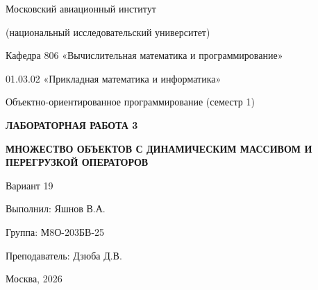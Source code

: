 \begin{titlepage}
\thispagestyle{empty}
\centering

{\Large Московский авиационный институт\par}
{\large (национальный исследовательский университет)\par}

\vspace{0.6cm}

{\large Кафедра 806 «Вычислительная математика и программирование»\par}
\vspace{0.3cm}
{\large 01.03.02 «Прикладная математика и информатика»\par}

\vspace{0.4cm}

{\large Объектно-ориентированное программирование (семестр 1)\par}

\vfill

{\LARGE\bfseries ЛАБОРАТОРНАЯ РАБОТА 3\par}
\vspace{0.4cm}
{\Large\bfseries МНОЖЕСТВО ОБЪЕКТОВ С ДИНАМИЧЕСКИМ МАССИВОМ И ПЕРЕГРУЗКОЙ ОПЕРАТОРОВ\par}

\vspace{1.4cm}

{\large Вариант 19\par}

\vfill

\begin{flushright}
\begin{minipage}{0.55\textwidth}
Выполнил: Яшнов В.А.

\vspace{0.5cm}

Группа: М8О-203БВ-25

\vspace{0.5cm}

Преподаватель: Дзюба Д.В.
\end{minipage}
\end{flushright}

\vspace{0.8cm}

{\large Москва, 2026\par}

\end{titlepage}

\tableofcontents
\clearpage
{}
\setcounter{page}{2}

